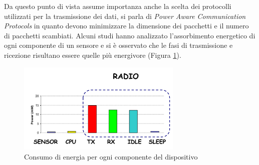 	Da questo punto di vista assume importanza anche la scelta dei protocolli utilizzati per la trasmissione dei dati, si parla di \emph{Power Aware Communication Protocols} in quanto devono minimizzare la dimensione dei pacchetti e il numero di pacchetti scambiati.
	Alcuni studi hanno analizzato l'assorbimento energetico di ogni componente di un sensore e si è osservato che le fasi di trasmissione e ricezione risultano essere quelle più energivore (Figura \ref{fig:consumoEnergiaDispositivo}).
	
	\begin{figure}[h]
		\centering
		\includegraphics[width=0.7\textwidth]{lez3-progettazione/img/consumoEnergiaDispositivo.png}
		\caption{Consumo di energia per ogni componente del dispositivo}
		\label{fig:consumoEnergiaDispositivo}
	\end{figure}
	
	
	
	
	